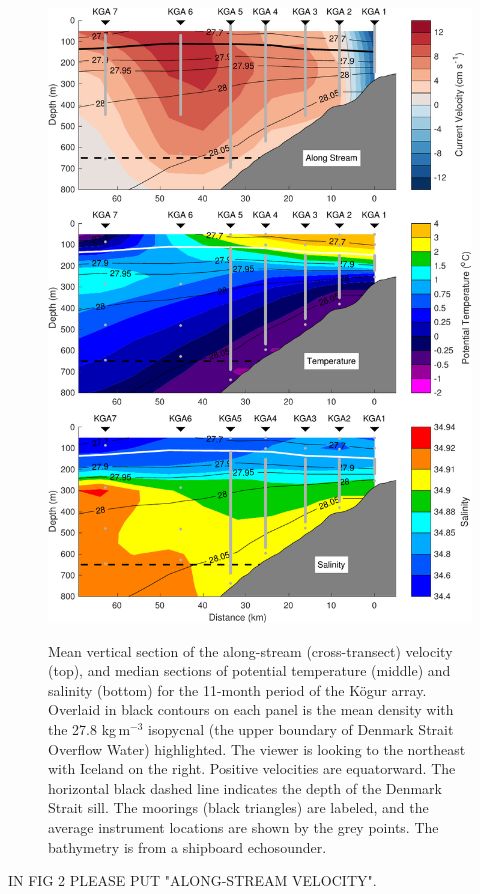 \documentclass[12pt,titlepage,figuresatend]{article}
\begin{document}
\begin{figure}[p!]
  \centering\includegraphics[width=.9\hsize]{./figures/plot_section.pdf}
  \caption{Mean vertical section of the along-stream (cross-transect) velocity (top), and median sections of potential temperature (middle) and salinity (bottom) for the 11-month period of the K\"{o}gur array. Overlaid in black contours on each panel is the mean density with the 27.8 kg$\,$m$^{-3}$ isopycnal (the upper boundary of Denmark Strait Overflow Water) highlighted. The viewer is looking to the northeast with Iceland on the right. Positive velocities are equatorward. The horizontal black dashed line indicates the depth of the Denmark Strait sill. The moorings (black triangles) are labeled, and the 
  average instrument locations are shown by the grey points. The bathymetry is from a shipboard echosounder.}{\label{fig_section}}
\end{figure}

IN FIG 2 PLEASE PUT "ALONG-STREAM VELOCITY". 
\end{document}
